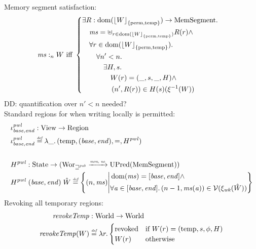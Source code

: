 \documentclass[a4paper]{article}
\DeclarePairedDelimiter\floor{\lfloor}{\rfloor}
\newcommand{\monnefun}{\xrightarrow{\textit{\tiny{mon, ne}}}}
\newcommand{\fun}{\rightarrow}
\newcommand{\defeq}{\stackrel{\textit{\tiny{def}}}{=}}
\DeclareMathOperator{\dom}{dom}
\newcommand\dominique[1]{{\color{purple} \sf \footnotesize {DD: #1}}\\}
\newcommand{\var}[1]{\mathit{#1}}
\newcommand{\hs}{\var{ms}}
\newcommand{\addr}{\var{a}}
\newcommand{\start}{\var{base}}
\newcommand{\addrend}{\var{end}}
\newcommand{\heap}{\var{mem}}
\newcommand{\plainfun}[2]{
  \ifthenelse{\equal{#2}{}}
             {\mathit{#1}}
             {\mathit{#1}(#2)}
}
\newcommand{\revokeTemp}[1]{\plainfun{revokeTemp}{#1}}
\newcommand{\erase}[2]{\floor*{#1}_{\{#2\}}}
\newcommand{\futurewk}{\mathbin{\sqsupseteq}^{\var{pub}}}
\newcommand{\heapSat}[3][\heap]{#1 :_{#2} #3}
\newcommand{\asmType}{\plaindom{AsmType}}
\newcommand{\plaindom}[1]{\mathrm{#1}}
\newcommand{\HeapSegments}{\plaindom{MemSegment}}
\newcommand{\States}{\plaindom{State}}
\newcommand{\Regions}{\plaindom{Region}}
\newcommand{\Worlds}{\plaindom{World}}
\newcommand{\Wor}{\plaindom{Wor}}
\newcommand{\Worwk}{\Wor_{\futurewk}}
\newcommand{\UPred}[1]{\plaindom{UPred}(#1)}
\newcommand{\Views}{\plaindom{View}}
\newcommand{\intr}[2]{\mathcal{#1}}
\newcommand{\valueintr}[1]{\intr{V}{#1}}
\newcommand{\stdvr}{\valueintr{\asmType}}
\newcommand{\npair}[2][n]{\left(#1,#2 \right)}
\newcommand{\plainview}[1]{\mathrm{#1}}
\newcommand{\perma}{\plainview{perm}}
\newcommand{\temp}{\plainview{temp}}
\newcommand{\revoked}{\plainview{revoked}}
\begin{document}
Memory segment satisfaction:
\begin{align*}
  &\heapSat[\hs]{n}{W} 
  \text{ iff }
  \left\{\begin{aligned}
    &\exists R : \dom(\erase{W}{\perma,\temp}) \rightarrow \HeapSegments \ldotp \\
    &\quad \hs = \uplus_{r\in\dom(\erase{W}{\perma,\temp})}R(r) \land \\
    &\quad \forall r \in \dom(\erase{W}{\perma,\temp}) \ldotp\\
    &\qquad \forall n'<n \ldotp \\
    &\qquad \quad \exists H,s \ldotp\\
    &\qquad \qquad W(r) = (\_,s,\_,H) \land \\
    &\qquad \qquad \npair[n']{R(r)} \in H(s)(\xi^{-1}(W))\\
  \end{aligned}\right.
\end{align*}
\dominique{quantification over $n' < n$ needed?}

Standard regions for when writing locally is permitted:
\begin{align*}
  &\iota_{\start,\addrend}^{\var{pwl}} : \Views \fun \Regions\\
  &\iota_{\start,\addrend}^{\var{pwl}} \defeq \lambda \_ \ldotp(\temp,(\start,\addrend),=,H^{\var{pwl}}) \\ \\
  &H^{\var{pwl}} : \States \fun (\Worwk \monnefun \UPred{\HeapSegments})\\
  &H^{\var{pwl}} \; (\start,\addrend) \; \hat{W} \defeq \left\{\npair{\hs} \middle|
    \begin{aligned}
      &\dom(\hs) = [\start,\addrend] \land \\
      &\forall \addr \in [\start,\addrend] \ldotp \npair[n-1]{\hs(\addr)} \in \stdvr(\xi_{\var{wk}}(\hat{W}))
    \end{aligned}
  \right\}
\end{align*}
Revoking all temporary regions:
\begin{align*}
  \revokeTemp{} & : \Worlds \fun \Worlds \\
  \revokeTemp{W} & \defeq \lambda r \ldotp 
                   \begin{cases}
                     \revoked            & \text{if }W(r) = (\temp,s,\phi,H) \\
                     W(r)                & \text{otherwise}
                   \end{cases}
\end{align*}
\newcommand{\wrev}[1]{\revokeTemp{#1}}
\end{document}

